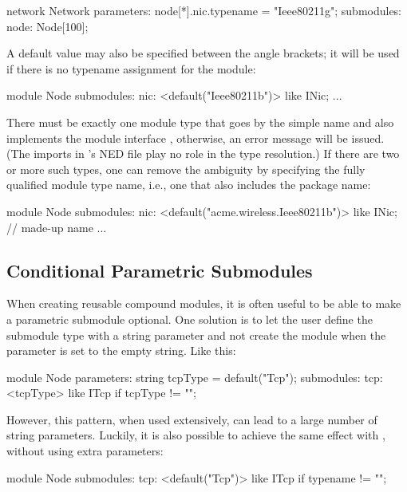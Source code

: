 \begin{ned}
network Network
{
    parameters:
        node[*].nic.typename = "Ieee80211g";
    submodules:
        node: Node[100];
}
\end{ned}

A default value may also be specified between the angle brackets; it will be
used if there is no typename assignment for the module:

\begin{ned}
module Node
{
    submodules:
        nic: <default("Ieee80211b")> like INic;
        ...
}
\end{ned}

There must be exactly one module type that goes by the simple name
 and also implements the module interface , otherwise,
an error message will be issued. (The imports in 's NED file play no
role in the type resolution.) If there are two or more such types, one can
remove the ambiguity by specifying the fully qualified module type name, i.e.,
one that also includes the package name:

\begin{ned}
module Node
{
    submodules:
        nic: <default("acme.wireless.Ieee80211b")> like INic; // made-up name
        ...
}
\end{ned}

\subsection{Conditional Parametric Submodules}
\label{sec:ned-lang:conditional-parametric-submodules}

When creating reusable compound modules, it is often useful to be able to make a
parametric submodule optional. One solution is to let the user define the
submodule type with a string parameter and not create the module when the
parameter is set to the empty string. Like this:

\begin{ned}
module Node
{
    parameters:
        string tcpType = default("Tcp");
    submodules:
        tcp: <tcpType> like ITcp if tcpType != "";
}
\end{ned}

However, this pattern, when used extensively, can lead to a large number of
string parameters. Luckily, it is also possible to achieve the same effect with
, without using extra parameters:

\begin{ned}
module Node
{
    submodules:
        tcp: <default("Tcp")> like ITcp if typename != "";
}
\end{ned}


